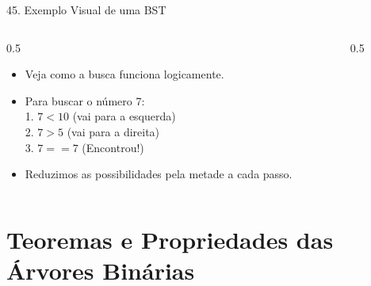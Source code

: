 \documentclass[9pt]{beamer}
\begin{document}
    \begin{frame}{45. Exemplo Visual de uma BST}
        \begin{columns}
            \begin{column}{0.5\textwidth}
                \begin{itemize}
                    \item Veja como a busca funciona logicamente.
                    \item Para buscar o número 7: \\
                    1. $7 < 10$ (vai para a esquerda) \\
                    2. $7 > 5$ (vai para a direita) \\
                    3. $7 == 7$ (Encontrou!)
                    \item Reduzimos as possibilidades pela metade a cada passo.
                \end{itemize}
            \end{column}
            \begin{column}{0.5\textwidth}
                \centering
            \end{column}
        \end{columns}
    \end{frame}

    \section{Teoremas e Propriedades das Árvores Binárias}
\end{document}
